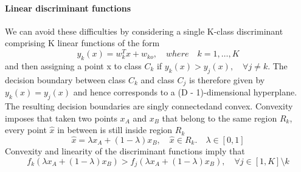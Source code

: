 \documentclass[../main.tex]{subfiles}
\begin{document}
\newpage
\paragraph{Linear discriminant functions}
We can avoid these difficulties by considering a single K-class discriminant comprising K linear functions of the form
\begin{equation}
    y_k(x) = w_k^Tx + w_{ko},\quad where \quad k=1,\dots,K
\end{equation}
and then assigning a point x to class $C_k$ if $y_k(x) > y_j (x), \quad \forall j \neq k$. The decision boundary between class $C_k$ and class $C_j$ is therefore given by $y_k(x) = y_j(x)$ and hence corresponds to a (D - 1)-dimensional hyperplane.
The resulting decision boundaries are singly connected\footnotemark and convex. Convexity imposes that taken two points $x_A$ and $x_B$ that belong to the same region $R_k$, every point $\hat{x}$ in between is still inside region $R_k$
\begin{equation*}
    \hat{x} = \lambda x_A + (1-\lambda)x_B, \quad \hat{x}\in R_k. \quad \lambda \in [0, 1]
\end{equation*}
Convexity and linearity of the discriminant functions imply that
\begin{equation*}
    f_k(\lambda x_A + (1-\lambda)x_B) > f_j(\lambda x_A + (1-\lambda)x_B), \quad \forall j \in [1, K] \setminus k
\end{equation*}
\end{document}
